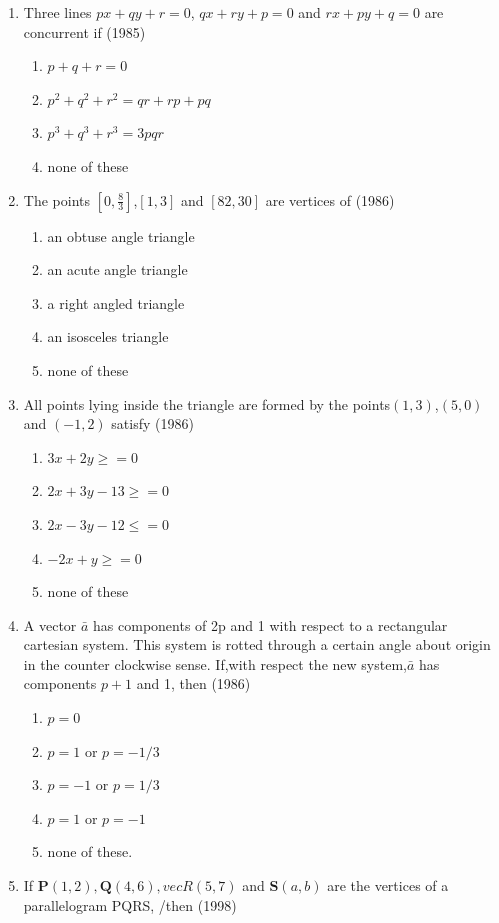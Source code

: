 \documentclass[12pt]{article}
\providecommand{\brak}[1]{\ensuremath{\left(#1\right)}}
\providecommand{\sbrak}[1]{\ensuremath{{}\left[#1\right]}}
\let\vec\mathbf
\begin{document}
\begin{enumerate}
\begin{enumerate}
		\fi
\item Three lines $px+qy+r=0$, $qx+ry+p=0$ and $rx+py+q=0$ are concurrent if  (1985)
\begin{enumerate}
\item $p+q+r=0$
\item $p^2+q^2+r^2=qr+rp+pq$
\item $p^3+q^3+r^3=3pqr$
\item none of these
\end{enumerate}
\item The points $\sbrak{0,\frac{8}{3}}$,$\sbrak{1,3}$ and $\sbrak{82,30}$ are vertices of (1986)
\begin{enumerate}
\item an obtuse angle triangle
\item an acute angle triangle 
\item a  right angled triangle
\item an isosceles triangle
\item none of these
\end{enumerate}
\item All points lying inside the triangle are formed by the points$\brak{1,3}$,$(5,0)$ and $(-1,2)$ satisfy (1986)
\begin{enumerate}
\item $3x+2y\ge=0$
\item $2x+3y-13\ge=0$
\item $2x-3y-12\le=0$
\item $-2x+y\ge=0$
\item none of these
\end{enumerate}
\item A vector $\bar{a}$ has components of 2p and 1 with respect to a rectangular cartesian system. This system is rotted through a certain angle about origin in the counter clockwise sense. If,with respect the new system,$\bar{a}$ has components $p+1$ and 1, then (1986)
\begin{enumerate}
\item $p=0$  
\item $p=1$ or  $p=-1/3$  
\item $p=-1$ or $p=1/3$ 
\item $p=1$ or  $p=-1$
\item none of these.
\end{enumerate}
\item  If $\vec{P}(1,2),\vec{Q}(4,6),vec{R}(5,7)$ and $\vec{S}(a,b)$ are the vertices of a parallelogram PQRS, /then (1998)

\end{enumerate}
\end{enumerate}
\end{document}
